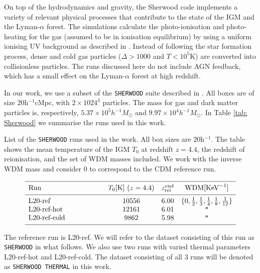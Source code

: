 On top of the hydrodynamics and gravity, the Sherwood code implements a variety of relevant physical processes that contribute to the state of the IGM and the Lyman-$\alpha$ forest. The simulations calculate the photo-ionisation and photo-heating for the gas (assumed to be in ionisation equilibrium) by using a uniform ionising UV background as described in \cite{Haardt2012}. Instead of following the star formation process, dense and cold gas particles ($\Delta>1000$ and $T<10^5$K) are converted into collisionless particles. The runs discussed here do not include AGN feedback, which has a small effect on the Lyman-$\alpha$ forest at high redshift.

In our work, we use a subset of the \texttt{SHERWOOD} suite described in \cite{sherwood_wdm}. All boxes are of size 20h$^{-1}$cMpc, with $2\times 1024^3$ particles. The mass for gas and dark matter particles is, respectively, $5.37\times 10^5h^{-1}M_\odot$ and $9.97\times 10^4h^{-1}M_\odot$. In Table \ref{tab: Sherwood} we summarise the runs used in this work.


\begin{table}
        \caption[]{List of the \texttt{SHERWOOD} runs used in the work.
        All box sizes are 20h$^{-1}$. The table shows the mean temperature of the IGM $T_0$ at redshift $z=4.4$, the redshift of reionisation, and the set of WDM masses included. We work with the inverse WDM mass and consider 0 to correspond to the CDM reference run.}
           \label{tab: Sherwood}
       $$ 
           \begin{array}{p{0.3\linewidth}ccc}
              \hline
              \noalign{\smallskip}
              Run      &  T_0 {[\mathrm{K}]}\ (z=4.4) &z_\mathrm{rei}^\mathrm{end}& \mathrm{WDM} [\mathrm{KeV}^{-1}] \\ 
              \noalign{\smallskip}
              \hline
              \noalign{\smallskip}
              L20-ref & 10556 &6.00&\{0,\frac{1}{2}, \frac{1}{3}, \frac{1}{4}, \frac{1}{8}, \frac{1}{12} \}     \\
              L20-ref-hot           & 12161&6.01  &\texttt{"}\\
              L20-ref-cold     & 9862  &5.98&       \texttt{"}     \\
              \noalign{\smallskip}
              \hline
           \end{array}
       $$ 
     \end{table}
The reference run is L20-ref. We will refer to the dataset consisting of this run as \texttt{SHERWOOD} in what follows. We also use two runs with varied thermal parameters L20-ref-hot and L20-ref-cold. The dataset consisting of all 3 runs will be denoted as \texttt{SHERWOOD THERMAL} in this work.

